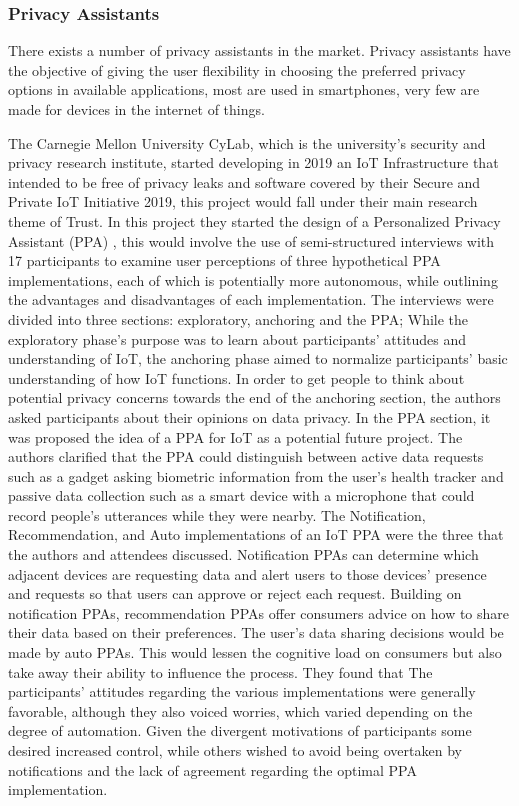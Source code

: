 \documentclass[conference]{IEEEtran}
\begin{document}
\subsubsection{Privacy Assistants}

There exists a number of privacy assistants in the market. Privacy assistants
have the objective of giving the user flexibility in choosing the preferred
privacy options in available applications, most are used in smartphones,
very few are made for devices in the internet of things.

The Carnegie Mellon University CyLab, which is the university's security
and privacy research institute, started developing in 2019 an IoT Infrastructure
that intended to be free of privacy leaks and software covered by their
Secure and Private IoT Initiative 2019, this project would fall under
their main research theme of Trust. In this project they started the design
of a Personalized Privacy Assistant (PPA) \cite{ColnagoInforming}, this
would involve the use of semi-structured interviews with 17 participants
to examine user perceptions of three hypothetical PPA implementations,
each of which is potentially more autonomous, while outlining the advantages
and disadvantages of each implementation. The interviews were divided into
three sections: exploratory, anchoring and the PPA; While the exploratory
phase's purpose was to learn about participants' attitudes and understanding
of IoT, the anchoring phase aimed to normalize participants' basic understanding
of how IoT functions. In order to get people to think about potential privacy
concerns towards the end of the anchoring section, the authors asked participants
about their opinions on data privacy. In the PPA section, it was proposed
the idea of a PPA for IoT as a potential future project. The authors clarified
that the PPA could distinguish between active data requests such as a gadget
asking biometric information from the user's health tracker and passive data
collection such as a smart device with a microphone that could record people's
utterances while they were nearby. The Notification, Recommendation, and Auto
implementations of an IoT PPA were the three that the authors and attendees
discussed. Notification PPAs can determine which adjacent devices are requesting
data and alert users to those devices' presence and requests so that users
can approve or reject each request. Building on notification PPAs, recommendation
PPAs offer consumers advice on how to share their data based on their preferences.
The user's data sharing decisions would be made by auto PPAs. This would lessen
the cognitive load on consumers but also take away their ability to influence
the process. They found that The participants' attitudes regarding the various
implementations were generally favorable, although they also voiced worries,
which varied depending on the degree of automation. Given the divergent
motivations of participants some desired increased control, while others
wished to avoid being overtaken by notifications and the lack of agreement
regarding the optimal PPA implementation.
\end{document}
